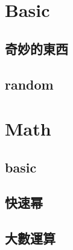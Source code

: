 \documentclass[a4paper,10pt,twocolumn,oneside]{article}
\begin{document}
\pagestyle{fancy}
\fancyfoot{}
\fancyhead[R]{\thepage}
\renewcommand{\headrulewidth}{0.4pt}
\renewcommand{\contentsname}{Contents} 

\newcommand{\includetex}[2]{
  \subsection{#1}
  
  \vspace{-1.2em}
}
\scriptsize
\tableofcontents



\section{Basic}

    \subsection{奇妙的東西}
    

    \subsection{random}
    


\section{Math}
  \subsection{basic}
  

  \subsection{快速幂}
  

  \subsection{大數運算}
  
\end{document}
